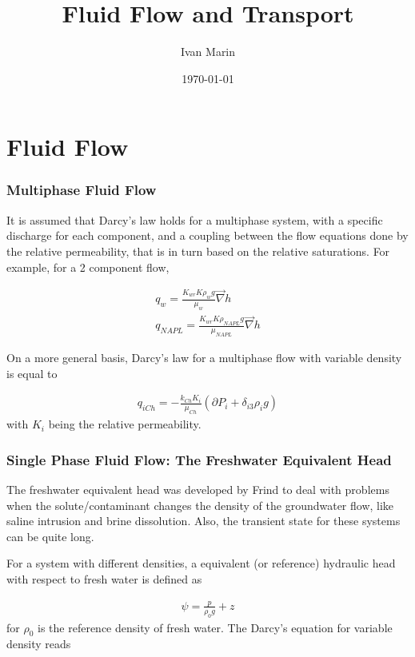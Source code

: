 \documentclass[11pt,twoside]{report}
\title{Fluid Flow and Transport}
\author{Ivan Marin}
\date{\today}
\begin{document}
\maketitle
\tableofcontents



\chapter{Fluid Flow}
\subsection{Multiphase Fluid Flow}

It is assumed that Darcy's law holds for a multiphase system, with a specific discharge for each component, and a coupling between the flow equations done by the relative permeability, that is in turn based on the relative saturations. For example, for a 2 component flow, 

\begin{align}
   q_{w} = \frac{K_{wr}K \rho_{w}g}{\mu_{w}} \vec{\nabla}h \\ 
   q_{NAPL} = \frac{K_{wr}K \rho_{NAPL}g}{\mu_{NAPL}} \vec{\nabla}h
\end{align}

On a more general basis, Darcy's law for a multiphase flow with variable density is equal to

\begin{align}
   q_{iCh} = -\frac{k_{Ch}K_{i}}{\mu_{Ch}}\left(\partial P_{i} + \delta_{i3}\rho_{i}g\right)
\end{align}
with $K_{i}$ being the relative permeability.

\subsection{Single Phase Fluid Flow: The Freshwater Equivalent Head}
The freshwater equivalent head was developed by Frind \cite{frind1982} to deal with problems when the solute/contaminant changes the density of the groundwater flow, like saline intrusion and brine dissolution. Also, the transient state for these systems can be quite long. 

For a system with different densities, a equivalent (or reference) hydraulic head with respect to fresh water is defined as

\begin{align}\label{freshwaterhead}
   \psi = \frac{p}{\rho_{0}g} + z
\end{align}
for $\rho_{0}$ is the reference density of fresh water. The Darcy's equation for variable density reads
\end{document}

